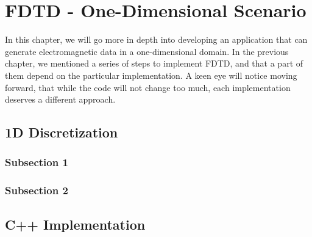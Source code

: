 
\chapter{FDTD - One-Dimensional Scenario} %

\label{Chapter2} %

In this chapter, we will go more in depth into developing an application that can generate electromagnetic data in a one-dimensional domain. In the previous chapter, we mentioned a series of steps to implement FDTD, and that a part of them depend on the particular implementation. A keen eye will notice moving forward, that while the code will not change too much, each implementation deserves a different approach.


\section{1D Discretization}



\subsection{Subsection 1}




\subsection{Subsection 2}



\section{C++ Implementation}

